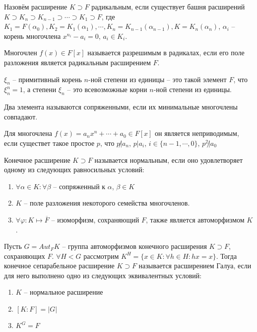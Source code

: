 \documentclass{article}
\begin{document}
\begin{definition}
    Назовём расширение $K \supset F$ радикальным, если существует башня расширений $K \supset K_n \supset K_{n - 1}
    \supset \cdots \supset K_1 \supset F$, где $K_1 = F(\alpha_0), K_2 = K_1(\alpha_1), \cdots, K_n = K_{n
    -1}(\alpha_{n - 1}), K = K_n(\alpha_n)$, $\alpha_i$ -- корень многочлена $x^{n_i} - a_i = 0$, $a_i \in K_i$.

    Многочлен $f(x) \in F[x]$ называется разрешимым в радикалах, если его поле разложения является радикальным
    расширением $F$.
\end{definition}

\begin{definition}
    $\xi_n$ -- примитивный корень $n$-ной степени из единицы -- это такой элемент $F$, что $\xi_n^n = 1$, а степени
    $\xi_n$ -- это всевозможные корни $n$-ной степени из единицы.
\end{definition}

\begin{definition}
    Два элемента называются сопряженными, если их минимальные многочлены совпадают.
\end{definition}

\begin{statement}
    Для многочлена $f(x) = a_n x^n + \cdots + a_0 \in F[x]$ он является неприводимым, если существет такое простое $p$,
    что $p \not | a_n$, $p | a_i$, $i \in \{n - 1, \cdots, 0\}$, $p^2 \not | a_0$
\end{statement}

\begin{definition}
    Конечное расширение $K \supset F$ называется нормальным, если оно удовлетворяет одному из следующих равносильных
    условий:
    \begin{enumerate}
        \item $\forall \alpha \in K: \forall \beta$ -- сопряженный к $\alpha$, $\beta \in K$
        \item $K$ -- поле разложения некоторого семейства многочленов.
        \item $\forall \varphi: K \mapsto \overline F$ -- изоморфизм, сохраняющий $F$, также является автоморфизмом $K$.
    \end{enumerate}
\end{definition}

\begin{definition}
    Пусть $G = Aut_F K$ -- группа автоморфизмов конечного расширения $K \supset F$, сохраняющих $F$. $\forall H < G$
    рассмотрим $K^H = \{x \in K: \forall h \in H: hx = x\}$. Тогда конечное сепарабельное расширение $K \supset F$
    называется расширением Галуа, если для него выполнено одно из следующих эквивалентных условий:
    \begin{enumerate}
        \item $K$ -- нормальное расширение
        \item $[K:F] = |G|$
        \item $K^G = F$
    \end{enumerate}
\end{definition}
\end{document}
